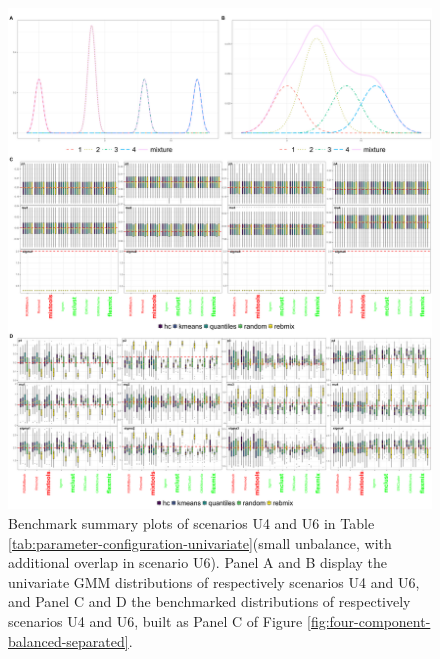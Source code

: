 \newpage
\begin{figure}

{\centering \includegraphics[width=1\linewidth]{figs/univariate/univariate_midbalanced} 

}

\caption{Benchmark summary plots of scenarios U4 and U6 in Table \ref{tab:parameter-configuration-univariate}(small unbalance, with additional overlap in scenario U6). Panel A and B display the univariate GMM distributions of respectively scenarios U4 and U6, and Panel C and D the benchmarked distributions of respectively scenarios U4 and U6, built as Panel C of Figure \ref{fig:four-component-balanced-separated}.}\label{fig:four-components-midbalanced}
\end{figure}

